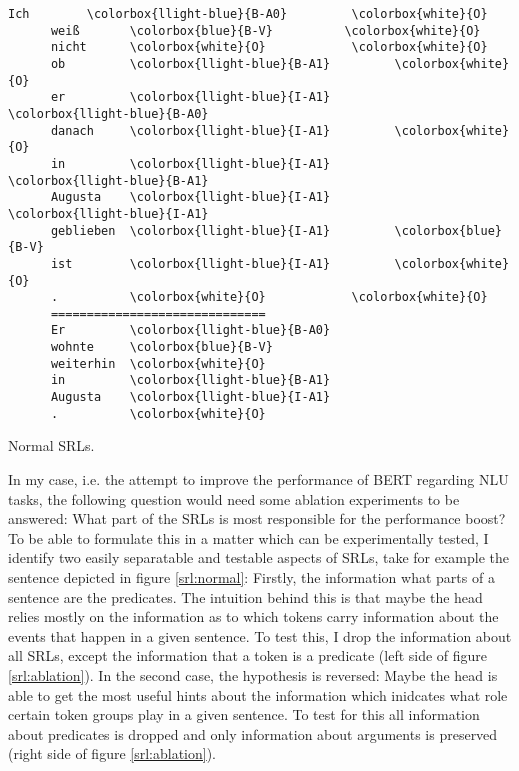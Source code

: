 {\begin{minipage}{1.0\linewidth}
  \begin{srl}
  \centering
    \begin{BVerbatim}[commandchars=\\\{\}, fontsize=\footnotesize]
      Ich        \colorbox{llight-blue}{B-A0}         \colorbox{white}{O}
      weiß       \colorbox{blue}{B-V}          \colorbox{white}{O}
      nicht      \colorbox{white}{O}            \colorbox{white}{O}
      ob         \colorbox{llight-blue}{B-A1}         \colorbox{white}{O}
      er         \colorbox{llight-blue}{I-A1}         \colorbox{llight-blue}{B-A0}
      danach     \colorbox{llight-blue}{I-A1}         \colorbox{white}{O}
      in         \colorbox{llight-blue}{I-A1}         \colorbox{llight-blue}{B-A1}
      Augusta    \colorbox{llight-blue}{I-A1}         \colorbox{llight-blue}{I-A1}
      geblieben  \colorbox{llight-blue}{I-A1}         \colorbox{blue}{B-V}
      ist        \colorbox{llight-blue}{I-A1}         \colorbox{white}{O}
      .          \colorbox{white}{O}            \colorbox{white}{O}
      ==============================
      Er         \colorbox{llight-blue}{B-A0}
      wohnte     \colorbox{blue}{B-V}
      weiterhin  \colorbox{white}{O}
      in         \colorbox{llight-blue}{B-A1}
      Augusta    \colorbox{llight-blue}{I-A1}
      .          \colorbox{white}{O}
    \end{BVerbatim}
    \caption{Normal SRLs.}
    \label{srl:normal}
  \end{srl}
\end{minipage}

In my case, i.e. the attempt to improve the performance of BERT regarding NLU tasks, the
following question would need some ablation experiments to be answered: What part of the SRLs
is most responsible for the performance boost? To be able to formulate this in a matter which
can be experimentally tested, I identify two easily separatable and testable aspects of SRLs,
take for example the sentence depicted in figure \ref{srl:normal}: Firstly, the information
what parts of a sentence are the predicates. The intuition behind this is that maybe the
head relies mostly on the information as to which tokens carry information about the events
that happen in a given sentence. To test this, I drop the information about all SRLs,
except the information that a token is a predicate (left side of figure \ref{srl:ablation}).
In the second case, the hypothesis is reversed: Maybe the head is able to get the most useful
hints about the information which inidcates what role certain token groups play in a given
sentence. To test for this all information about predicates is dropped and only information
about arguments is preserved (right side of figure \ref{srl:ablation}).

}

